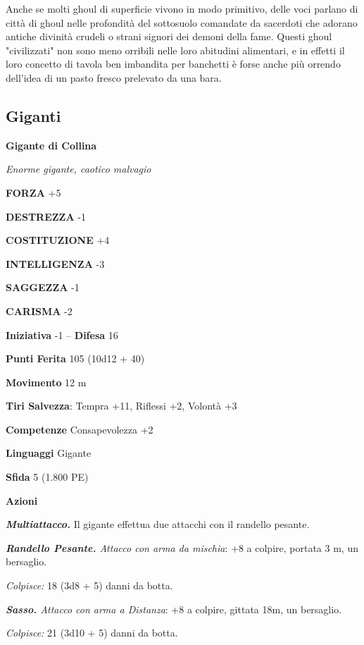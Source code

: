 \begin{multicols}{2}
Anche se molti ghoul di superficie vivono in modo primitivo, delle voci parlano di città di ghoul nelle profondità del sottosuolo comandate da sacerdoti che adorano antiche divinità crudeli o strani signori dei demoni della fame. Questi ghoul "civilizzati" non sono meno orribili nelle loro abitudini alimentari, e in effetti il loro concetto di tavola ben imbandita per banchetti è forse anche più orrendo dell'idea di un pasto fresco prelevato da una bara.\\


\subsection{Giganti}

\medskip{}\textbf{Gigante di Collina}

\emph{Enorme gigante, caotico malvagio}

\textbf{FORZA} +5

\textbf{DESTREZZA} -1

\textbf{COSTITUZIONE} +4

\textbf{INTELLIGENZA} -3

\textbf{SAGGEZZA} -1

\textbf{CARISMA} -2

\textbf{Iniziativa} -1 -- \textbf{Difesa} 16

\textbf{Punti Ferita} 105 (10d12 + 40)

\textbf{Movimento} 12 m

\textbf{Tiri Salvezza}: Tempra +11, Riflessi +2, Volontà +3

\textbf{Competenze} Consapevolezza +2

\textbf{Linguaggi} Gigante

\textbf{Sfida} 5 (1.800 PE)

\textbf{Azioni}

\emph{\textbf{Multiattacco.}} Il gigante effettua due attacchi con il randello pesante.

\emph{\textbf{Randello Pesante.} Attacco con arma da mischia}: +8 a colpire, portata 3 m, un bersaglio.

\emph{Colpisce:} 18 (3d8 + 5) danni da botta.

\emph{\textbf{Sasso.} Attacco con arma a Distanza}: +8 a colpire, gittata 18m, un bersaglio.

\emph{Colpisce:} 21 (3d10 + 5) danni da botta.


\end{multicols}
